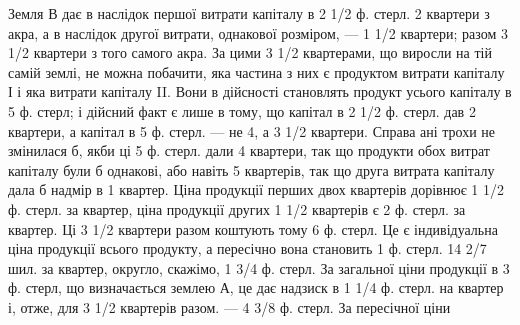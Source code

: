 Земля В дає в наслідок першої витрати капіталу в 2 1/2 ф. стерл. 2 квартери
з акра, а в наслідок другої витрати, однакової розміром, — 1 1/2 квартери; разом
3 1/2 квартери з того самого акра. За цими 3 1/2 квартерами, що виросли
на тій самій землі, не можна побачити, яка частина з них є продуктом витрати
капіталу І і яка витрати капіталу II. Вони в дійсності становлять продукт
усього капіталу в 5 ф. стерл; і дійсний факт є лише в тому, що капітал
в 2 1/2 ф. стерл. дав 2 квартери, а капітал в 5 ф. стерл. — не 4, а 3 1/2 квартери.
Справа ані трохи не змінилася б, якби ці 5 ф. стерл. дали 4 квартери, так що
продукти обох витрат капіталу були б однакові, або навіть 5 квартерів, так
що друга витрата капіталу дала б надмір в 1 квартер. Ціна продукції перших
двох квартерів дорівнює 1 1/2 ф. стерл. за квартер, ціна продукції других 1 1/2 квартерів є 2 ф.
стерл. за квартер. Ці 3 1/2 квартери разом коштують тому 6 ф. стерл.
Це є індивідуальна ціна продукції всього продукту, а пересічно вона становить
1 ф. стерл. 14 2/7 шил. за квартер, округло, скажімо, 1 3/4 ф. стерл. За загальної ціни
продукції в 3 ф. стерл, що визначається землею А, це дає надзиск в 1 1/4 ф. стерл.
на квартер і, отже, для 3 1/2 квартерів разом. — 4  3/8 ф. стерл. За пересічної ціни
\parbreak{}  %
